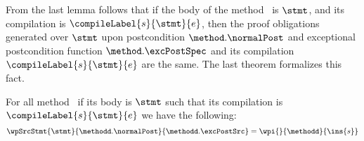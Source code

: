 From the last lemma follows that if the body of the  method \methodd \ is $\stmt$, and its compilation is $\compileLabel{s}{\stmt}{e}$, then 
the proof obligations generated over $\stmt$ upon postcondition $\method.\normalPost$ and exceptional
postcondition function  $\method.\excPostSpec$     and its compilation $\compileLabel{s}{\stmt}{e}$ are the same. The last theorem 
formalizes this fact.

\begin{theorem}
For all method \methodd \ if its body is $\stmt$ such that its compilation is 
 $\compileLabel{s}{\stmt}{e}$  we have the following:
$$ \wpSrcStmt{\stmt}{\methodd.\normalPost }{\methodd.\excPostSrc }  = \wpi{}{\methodd}{\ins{s} }$$
\end{theorem}
